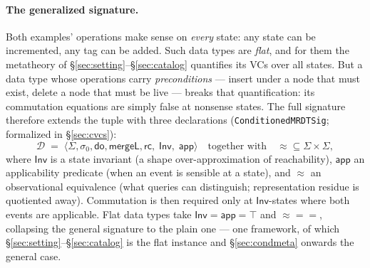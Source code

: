 \documentclass[11pt]{article}
\newcommand{\mergeL}{\mathsf{mergeL}}
\newcommand{\Sinit}{\sigma_0}
\newcommand{\lean}[1]{\texttt{#1}}
\newcommand{\M}[1]{\mathcal{#1}}
\newcommand{\eqobs}{\approx}
\newcommand{\Inv}{\mathsf{Inv}}
\newcommand{\app}{\mathsf{app}}
\begin{document}
\paragraph{The generalized signature.} Both examples' operations make
sense on \emph{every} state: any state can be incremented, any tag can be
added. Such data types are \emph{flat}, and for them the metatheory of
\S\ref{sec:setting}--\S\ref{sec:catalog} quantifies its VCs over all
states. But a data type whose operations carry \emph{preconditions} ---
insert under a node that must exist, delete a node that must be live ---
breaks that quantification: its commutation equations are simply false at
nonsense states. The full signature therefore extends the tuple with
three declarations (\lean{ConditionedMRDTSig}; formalized in
\S\ref{sec:cvcs}):
\[
  \M{D} \;=\; \langle \Sigma, \Sinit, \mathsf{do}, \mergeL, \mathsf{rc},\;
  \Inv,\; \app \rangle
  \quad\text{together with}\quad {\eqobs} \subseteq \Sigma \times \Sigma ,
\]
where $\Inv$ is a state invariant (a shape over-approximation of
reachability), $\app$ an applicability predicate (when an event is
sensible at a state), and $\eqobs$ an observational equivalence (what
queries can distinguish; representation residue is quotiented away).
Commutation is then required only at $\Inv$-states where both events are
applicable. Flat data types take $\Inv = \app = \top$ and
${\eqobs} = {=}$, collapsing the general signature to the plain one ---
one framework, of which \S\ref{sec:setting}--\S\ref{sec:catalog} is the
flat instance and \S\ref{sec:condmeta} onwards the general case.
\end{document}
